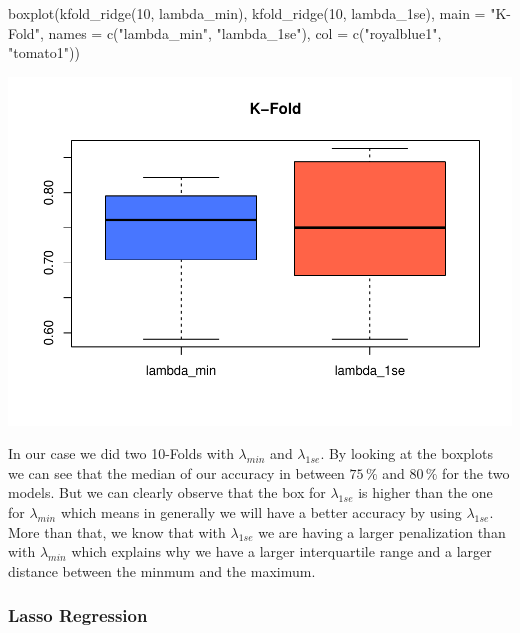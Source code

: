 \documentclass[
]{article}
\newenvironment{Shaded}{\begin{snugshade}}{\end{snugshade}}
\newcommand{\AttributeTok}[1]{\textcolor[rgb]{0.77,0.63,0.00}{#1}}
\newcommand{\DecValTok}[1]{\textcolor[rgb]{0.00,0.00,0.81}{#1}}
\newcommand{\FunctionTok}[1]{\textcolor[rgb]{0.00,0.00,0.00}{#1}}
\newcommand{\NormalTok}[1]{#1}
\newcommand{\StringTok}[1]{\textcolor[rgb]{0.31,0.60,0.02}{#1}}
\begin{document}
\begin{Shaded}
\begin{Highlighting}[]
\FunctionTok{boxplot}\NormalTok{(}\FunctionTok{kfold\_ridge}\NormalTok{(}\DecValTok{10}\NormalTok{, lambda\_min), }\FunctionTok{kfold\_ridge}\NormalTok{(}\DecValTok{10}\NormalTok{, lambda\_1se), }\AttributeTok{main =} \StringTok{"K{-}Fold"}\NormalTok{, }
        \AttributeTok{names =} \FunctionTok{c}\NormalTok{(}\StringTok{"lambda\_min"}\NormalTok{, }\StringTok{"lambda\_1se"}\NormalTok{), }\AttributeTok{col =} \FunctionTok{c}\NormalTok{(}\StringTok{"royalblue1"}\NormalTok{, }\StringTok{"tomato1"}\NormalTok{))}
\end{Highlighting}
\end{Shaded}

\begin{center}\includegraphics{TP3_MERR_HABBOU_KHIDOUR_files/figure-latex/unnamed-chunk-46-1} \end{center}

In our case we did two 10-Folds with \(\lambda_{min}\) and
\(\lambda_{1se}\). By looking at the boxplots we can see that the median
of our accuracy in between \(75\,\%\) and \(80\,\%\) for the two models.
But we can clearly observe that the box for \(\lambda_{1se}\) is higher
than the one for \(\lambda_{min}\) which means in generally we will have
a better accuracy by using \(\lambda_{1se}\). More than that, we know
that with \(\lambda_{1se}\) we are having a larger penalization than
with \(\lambda_{min}\) which explains why we have a larger interquartile
range and a larger distance between the minmum and the maximum.

\hypertarget{lasso-regression}{%
\subsubsection{Lasso Regression}\label{lasso-regression}}
\end{document}
